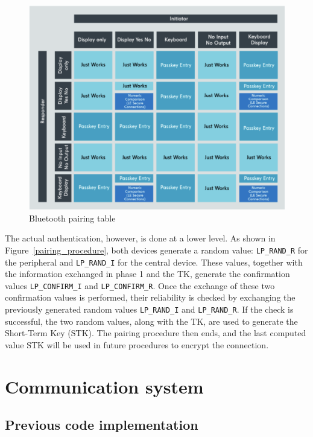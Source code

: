 \documentclass{Configuration_Files/PoliMi3i_thesis}
\begin{document}
\begin{figure}[H]
    \centering
    \includegraphics[scale=0.7]{Bluetooth_Security/3.png}
    \caption{Bluetooth pairing table \cite{PairingProcess}}
    \label{bluetooth_sec_3}
\end{figure}

The actual authentication, however, is done at a lower level. As shown in Figure~\ref{pairing_procedure}, both devices generate a random value: \texttt{LP\_RAND\_R} for the peripheral and \texttt{LP\_RAND\_I} for the central device. These values, together with the information exchanged in phase 1 and the TK, generate the confirmation values \texttt{LP\_CONFIRM\_I} and \texttt{LP\_CONFIRM\_R}. Once the exchange of these two confirmation values is performed, their reliability is checked by exchanging the previously generated random values \texttt{LP\_RAND\_I} and \texttt{LP\_RAND\_R}. If the check is successful, the two random values, along with the TK, are used to generate the Short-Term Key (STK). The pairing procedure then ends, and the last computed value STK will be used in future procedures to encrypt the connection.

\section{Communication system}

\subsection{Previous code implementation}
\end{document}
